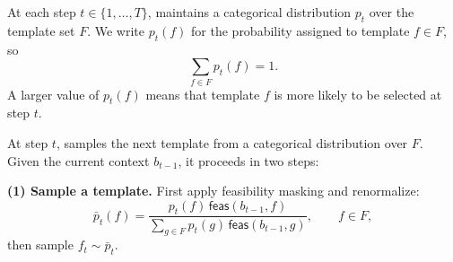 At each step \(t\in\{1,\ldots,T\}\), \sys maintains a categorical distribution \(p_t\) over the
template set \(F\). We write \(p_t(f)\) for the probability   assigned to template \(f\in F\), so
\begin{equation}
\sum_{f\in F} p_t(f)=1.
\end{equation}
A larger value of \(p_t(f)\) means that template \(f\) is more likely to be selected at step \(t\).



\medskip
{}
At step \(t\), \sys samples the next template from a categorical distribution over \(F\).
Given the current context \(b_{t-1}\), it proceeds in two steps:

\smallskip
\noindent\textbf{(1) Sample a template.}
First apply feasibility masking and renormalize:
\begin{equation}
\label{eq:feasibility-mask}
\bar p_t(f)
=
\frac{p_t(f)\,\mathsf{feas}(b_{t-1},f)}
{\sum_{g\in F} p_t(g)\,\mathsf{feas}(b_{t-1},g)},
\qquad f\in F,
\end{equation}
then sample \(f_t\sim \bar p_t\).

